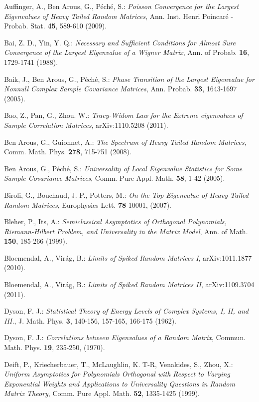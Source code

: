 \documentclass[reqno, 10pt]{amsart}
\theoremstyle{definition}
\theoremstyle{remark}
\numberwithin{equation}{section}
\numberwithin{thm}{section}
\begin{document}
\begin{thebibliography}{}

 Auffinger, A., Ben Arous, G., P\'ech\'e, S.: \emph{Poisson Convergence for the Largest Eigenvalues of Heavy Tailed Random Matrices}, Ann. Inst. Henri Poincar\'e - Probab. Stat. \textbf{45}, 589-610 (2009).

 Bai, Z. D., Yin, Y. Q.: \emph{Necessary and Sufficient Conditions for Almost Sure Convergence of the Largest Eigenvalue of a Wigner Matrix}, Ann. of Probab. \textbf{16}, 1729-1741 (1988).

 Baik, J., Ben Arous, G., P\'ech\'e, S.: \emph{Phase Transition of the Largest Eigenvalue for Nonnull Complex Sample Covariance Matrices}, Ann. Probab. \textbf{33}, 1643-1697 (2005).

 Bao, Z., Pan, G., Zhou. W.: \emph{Tracy-Widom Law for the Extreme eigenvalues of Sample Correlation Matrices}, arXiv:1110.5208 (2011).

 Ben Arous, G., Guionnet, A.: \emph{The Spectrum of Heavy Tailed Random Matrices}, Comm. Math. Phys. \textbf{278}, 715-751 (2008).

 Ben Arous, G., P\'ech\'e, S.: \emph{Universality of Local Eigenvalue Statistics for Some Sample Covariance Matrices}, Comm. Pure Appl. Math. \textbf{58}, 1-42 (2005).

 Biroli, G., Bouchaud, J.-P., Potters, M.: \emph{On the Top Eigenvalue of Heavy-Tailed Random Matrices},
Europhysics Lett. \textbf{78} 10001, (2007).

 Bleher, P., Its, A.: \emph{Semiclassical Asymptotics of Orthogonal Polynomials, Riemann-Hilbert Problem, and Universality in the Matrix Model}, Ann. of Math. \textbf{150}, 185-266 (1999).

 Bloemendal, A., Vir\'ag, B.: \emph{Limits of Spiked Random Matrices I}, arXiv:1011.1877 (2010).

 Bloemendal, A., Vir\'ag, B.: \emph{Limits of Spiked Random Matrices II}, arXiv:1109.3704 (2011).

 Dyson, F. J.: \emph{Statistical Theory of Energy Levels of Complex Systems, I, II, and III.}, J. Math. Phys. \textbf{3}, 140-156, 157-165, 166-175 (1962).

 Dyson, F. J.: \emph{Correlations between Eigenvalues of a Random Matrix}, Commun. Math. Phys. \textbf{19}, 235-250, (1970).

 Deift, P., Kriecherbauer, T., McLaughlin, K. T-R, Venakides, S., Zhou, X.: \emph{Uniform Asymptotics for Polynomials Orthogonal with Respect to Varying Exponential Weights and Applications to Universality Questions in Random Matrix Theory}, Comm. Pure Appl. Math. \textbf{52}, 1335-1425 (1999).


\end{thebibliography}
\end{document}
